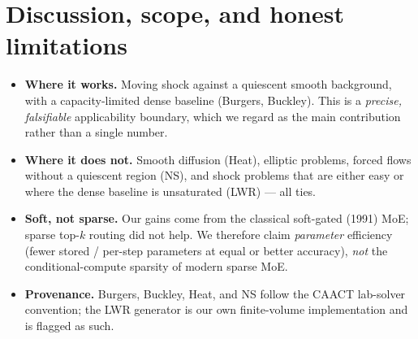 \documentclass[11pt]{article}
\begin{document}
\section{Discussion, scope, and honest limitations}\label{sec:disc}
\begin{itemize}[leftmargin=*,itemsep=3pt]
\item \textbf{Where it works.} Moving shock against a quiescent smooth background, with a
      capacity-limited dense baseline (Burgers, Buckley). This is a \emph{precise, falsifiable}
      applicability boundary, which we regard as the main contribution rather than a single number.
\item \textbf{Where it does not.} Smooth diffusion (Heat), elliptic problems, forced flows without a
      quiescent region (NS), and shock problems that are either easy or where the dense baseline is
      unsaturated (LWR) --- all ties.
\item \textbf{Soft, not sparse.} Our gains come from the classical soft-gated (1991) MoE; sparse
      top-$k$ routing did not help. We therefore claim \emph{parameter} efficiency (fewer stored /
      per-step parameters at equal or better accuracy), \emph{not} the conditional-compute sparsity
      of modern sparse MoE.
\item \textbf{Provenance.} Burgers, Buckley, Heat, and NS follow the CAACT lab-solver convention;
      the LWR generator is our own finite-volume implementation and is flagged as such.
\end{itemize}
\end{document}
